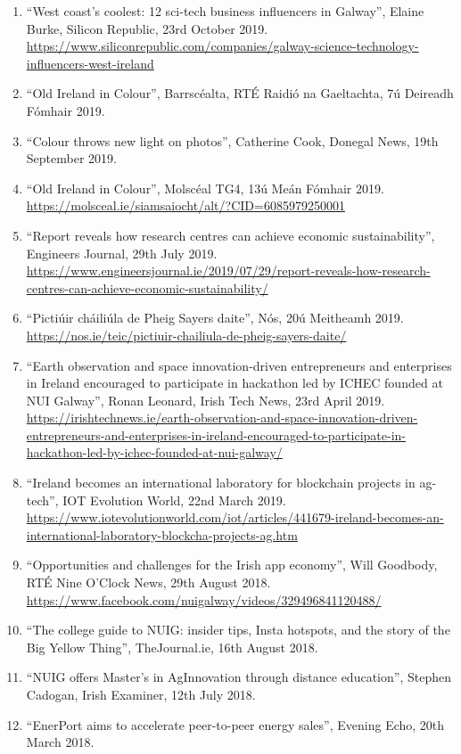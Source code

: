 \documentclass[10pt,a4paper]{res} %
\begin{document}
\begin{resume}
{\begin{enumerate}
\item ``West coast's coolest: 12 sci-tech business influencers in Galway'', Elaine Burke, Silicon Republic, 23rd October 2019. \url{https://www.siliconrepublic.com/companies/galway-science-technology-influencers-west-ireland}
\item ``Old Ireland in Colour'', Barrsc\'{e}alta, RT\'{E} Raidi\'{o} na Gaeltachta, 7\'{u} Deireadh F\'{o}mhair 2019.
\item ``Colour throws new light on photos'', Catherine Cook, Donegal News, 19th September 2019.
\item ``Old Ireland in Colour'', Molsc\'{e}al TG4, 13\'{u} Me\'{a}n F\'{o}mhair 2019. \url{https://molsceal.ie/siamsaiocht/alt/?CID=6085979250001}
\item ``Report reveals how research centres can achieve economic sustainability'', Engineers Journal, 29th July 2019. \url{https://www.engineersjournal.ie/2019/07/29/report-reveals-how-research-centres-can-achieve-economic-sustainability/}
\item ``Picti\'{u}ir ch\'{a}ili\'{u}la de Pheig Sayers daite'', N\'{o}s, 20\'{u} Meitheamh 2019. \url{https://nos.ie/teic/pictiuir-chailiula-de-pheig-sayers-daite/}
\item ``Earth observation and space innovation-driven entrepreneurs and enterprises in Ireland encouraged to participate in hackathon led by ICHEC founded at NUI Galway'', Ronan Leonard, Irish Tech News, 23rd April 2019. \url{https://irishtechnews.ie/earth-observation-and-space-innovation-driven-entrepreneurs-and-enterprises-in-ireland-encouraged-to-participate-in-hackathon-led-by-ichec-founded-at-nui-galway/}
\item ``Ireland becomes an international laboratory for blockchain projects in ag-tech'', IOT Evolution World, 22nd March 2019. \url{https://www.iotevolutionworld.com/iot/articles/441679-ireland-becomes-an-international-laboratory-blockcha-projects-ag.htm}
\item ``Opportunities and challenges for the Irish app economy'', Will Goodbody, RT\'{E} Nine O'Clock News, 29th August 2018. \url{https://www.facebook.com/nuigalway/videos/329496841120488/}
\item ``The college guide to NUIG: insider tips, Insta hotspots, and the story of the Big Yellow Thing'', TheJournal.ie, 16th August 2018.
\item ``NUIG offers Master's in AgInnovation through distance education'', Stephen Cadogan, Irish Examiner, 12th July 2018.
\item ``EnerPort aims to accelerate peer-to-peer energy sales'', Evening Echo, 20th March 2018.

\end{enumerate}}
\end{resume}
\end{document}
